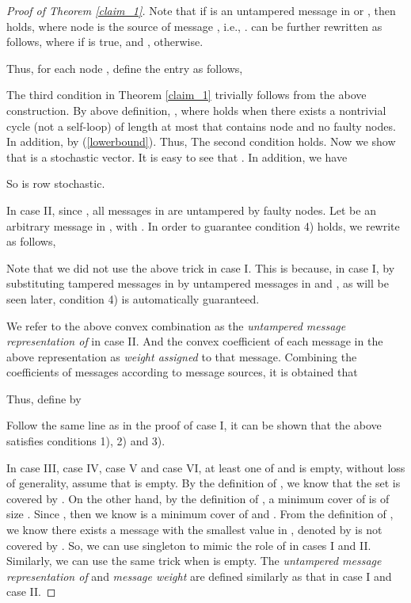 \documentclass[letterpaper, 11pt]{article}
\begin{document}
\begin{proof}[Proof of Theorem \ref{claim_1}]
Note that if  is an untampered message in  or
, then  holds, where node  is the source of message , i.e., .  can be further rewritten as follows, where  if  is true, and , otherwise.






Thus, for each node , define the entry  as follows,


The third condition in Theorem \ref{claim_1}
trivially follows from the above construction.
 By above definition, , where  holds when there exists a nontrivial cycle (not a self-loop) of length at most  that contains node  and no faulty nodes. In addition,  by (\ref{lowerbound}). Thus, 
The second condition holds.
 Now we show that  is a stochastic vector. It is easy to see that . In addition, we have


So  is row stochastic.

In case II, since , all messages in  are untampered by faulty nodes. Let  be an arbitrary message in , with . In order to guarantee condition 4) holds, we rewrite  as follows,

Note that we did not use the above trick in case I. This is because, in case I, by substituting tampered messages in  by untampered messages in  and , as will be seen later, condition 4) is automatically guaranteed.

We refer to the above convex combination as the \emph{untampered message representation of } in case II. And the convex coefficient of each message in the above representation as \emph{weight assigned} to that message. Combining the coefficients of messages according to message sources, it is obtained that


Thus, define  by

Follow the same line as in the proof of case I, it can be shown that the above  satisfies conditions 1), 2) and 3).


In case III, case IV, case V and case VI, at least one of  and  is empty, without loss of generality, assume that  is empty. By the definition of , we know that the set  is covered by . On the other hand, by the definition of , a minimum cover of  is of size . Since , then we know  is a minimum cover of  and .
 From the definition of , we know there exists a message with the smallest value in , denoted by  is not covered by . So, we can
  use singleton  to mimic the role of  in cases I and II. Similarly, we can use the same trick when  is empty. The \emph{untampered message representation of } and \emph{message weight} are defined similarly as that in case I and case II.







\end{proof}
\end{document}
